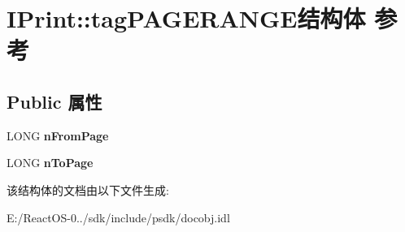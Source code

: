 \hypertarget{struct_i_print_1_1tag_p_a_g_e_r_a_n_g_e}{}\section{I\+Print\+:\+:tag\+P\+A\+G\+E\+R\+A\+N\+G\+E结构体 参考}
\label{struct_i_print_1_1tag_p_a_g_e_r_a_n_g_e}
\subsection*{Public 属性}
\begin{DoxyCompactItemize}
\item 
\mbox{\label{struct_i_print_1_1tag_p_a_g_e_r_a_n_g_e_aca47a3339f66a7ab1a5ca917b2000441}} 
L\+O\+NG {\bfseries n\+From\+Page}
\item 
\mbox{\label{struct_i_print_1_1tag_p_a_g_e_r_a_n_g_e_a9f799450a7f8c06a6965aa4e3ec567cd}} 
L\+O\+NG {\bfseries n\+To\+Page}
\end{DoxyCompactItemize}


该结构体的文档由以下文件生成\+:\begin{DoxyCompactItemize}
\item 
E\+:/\+React\+O\+S-\/0../sdk/include/psdk/docobj.\+idl\end{DoxyCompactItemize}
